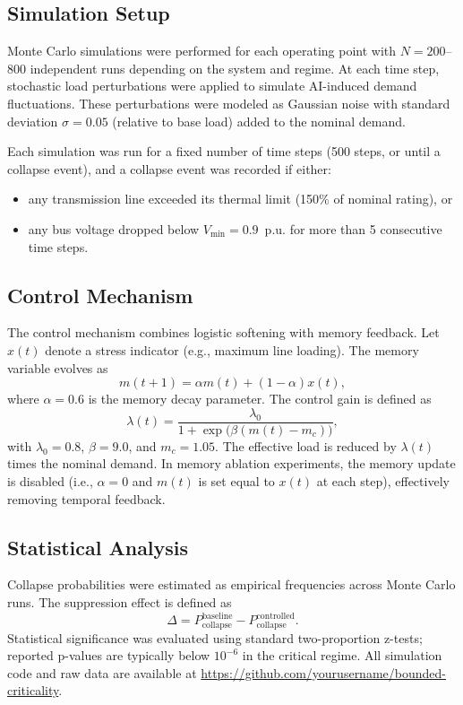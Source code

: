 \documentclass[11pt]{article}
\begin{document}
\subsection{Simulation Setup}

Monte Carlo simulations were performed for each operating point with $N = 200$--$800$ independent runs depending on the system and regime. At each time step, stochastic load perturbations were applied to simulate AI-induced demand fluctuations. These perturbations were modeled as Gaussian noise with standard deviation $\sigma = 0.05$ (relative to base load) added to the nominal demand.

Each simulation was run for a fixed number of time steps (500 steps, or until a collapse event), and a collapse event was recorded if either:
\begin{itemize}
    \item any transmission line exceeded its thermal limit (150\% of nominal rating), or
    \item any bus voltage dropped below $V_{\min}=0.9$~p.u. for more than 5 consecutive time steps.
\end{itemize}

\subsection{Control Mechanism}

The control mechanism combines logistic softening with memory feedback. Let $x(t)$ denote a stress indicator (e.g., maximum line loading). The memory variable evolves as
\[
m(t+1) = \alpha m(t) + (1-\alpha)x(t),
\]
where $\alpha = 0.6$ is the memory decay parameter. The control gain is defined as
\[
\lambda(t) = \frac{\lambda_0}{1 + \exp\bigl(\beta(m(t) - m_c)\bigr)},
\]
with $\lambda_0 = 0.8$, $\beta = 9.0$, and $m_c = 1.05$. The effective load is reduced by $\lambda(t)$ times the nominal demand. In memory ablation experiments, the memory update is disabled (i.e., $\alpha = 0$ and $m(t)$ is set equal to $x(t)$ at each step), effectively removing temporal feedback.

\subsection{Statistical Analysis}

Collapse probabilities were estimated as empirical frequencies across Monte Carlo runs. The suppression effect is defined as
\[
\Delta = P_{\mathrm{collapse}}^{\mathrm{baseline}} - P_{\mathrm{collapse}}^{\mathrm{controlled}}.
\]
Statistical significance was evaluated using standard two-proportion z-tests; reported p-values are typically below $10^{-6}$ in the critical regime. All simulation code and raw data are available at \url{https://github.com/yourusername/bounded-criticality}.
\end{document}
